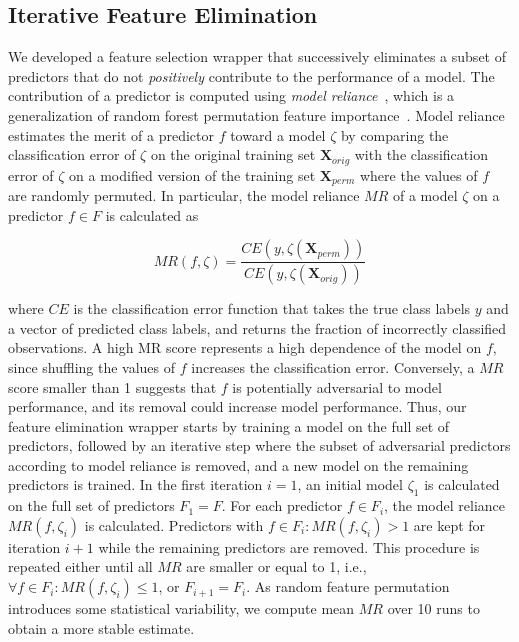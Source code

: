 \documentclass[
  oneside]{book}
\begin{document}
\hypertarget{iterative-feature-elimination}{%
\subsection{Iterative Feature Elimination}\label{iterative-feature-elimination}}

We developed a feature selection wrapper that successively eliminates a subset of predictors that do not \emph{positively} contribute to the performance of a model.
The contribution of a predictor is computed using \emph{model reliance}~\autocite{Fisher:ModelReliance2018}, which is a generalization of random forest permutation feature importance~\autocite{Breiman:RandomForests2001}.
Model reliance estimates the merit of a predictor \(f\) toward a model \(\zeta\) by comparing the classification error of \(\zeta\) on the original training set \(\mathbf{X}_{orig}\) with the classification error of \(\zeta\) on a modified version of the training set \(\mathbf{X}_{perm}\) where the values of \(f\) are randomly permuted.
In particular, the model reliance \(MR\) of a model \(\zeta\) on a predictor \(f\in F\) is calculated as

\begin{equation}
MR(f,\zeta) = \frac{CE(y,\zeta(\mathbf{X}_{perm}))}{CE(y,\zeta(\mathbf{X}_{orig}))}
\label{eq:model-reliance}
\end{equation}

where \(CE\) is the classification error function that takes the true class labels \(y\) and a vector of predicted class labels, and returns the fraction of incorrectly classified observations.
A high MR score represents a high dependence of the model on \(f\), since shuffling the values of \(f\) increases the classification error.
Conversely, a \(MR\) score smaller than 1 suggests that \(f\) is potentially adversarial to model performance, and its removal could increase model performance. Thus, our feature elimination wrapper starts by training a model on the full set of predictors, followed by an iterative step where the subset of adversarial predictors according to model reliance is removed, and a new model on the remaining predictors is trained.
In the first iteration \(i=1\), an initial model \(\zeta_1\) is calculated on the full set of predictors \(F_1 = F\).
For each predictor \(f \in F_i\), the model reliance \(MR(f,\zeta_i)\) is calculated.
Predictors with \(f\in F_i:MR(f,\zeta_i)>1\) are kept for iteration \(i+1\) while the remaining predictors are removed.
This procedure is repeated either until all \(MR\) are smaller or equal to 1, i.e., \(\forall f \in F_i: MR(f,\zeta_i) \leq 1\), or \(F_{i+1}=F_i\).
As random feature permutation introduces some statistical variability, we compute mean \(MR\) over 10 runs to obtain a more stable estimate.
\end{document}
